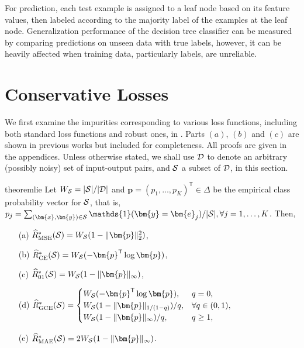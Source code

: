 \documentclass[letterpaper]{article} %
\newcommand{\bx}{{\bm{x}}}
\newcommand{\bp}{{\bm{p}}}
\newcommand{\by}{{\bm{y}}}
\newcommand{\be}{{\bm{e}}}
\newcommand{\T}{{\mathsf{T}}}
\newcommand{\I}{\mathds{1}}
\newcommand{\cS}{{\cal{S}}}
\newcommand{\cD}{{\cal{D}}}
\newcommand{\simplex}{\Delta}
\begin{document}
For prediction, each test example is assigned to a leaf node based on its
feature values, then labeled according to the majority label of the examples at
the leaf node.
Generalization performance of the decision tree classifier can be measured by
comparing predictions on unseen data with true labels, however, it can be
heavily affected when training data, particularly labels, are unreliable.

\section{Conservative Losses}
\label{sec:theory}

We first examine the impurities corresponding to various loss functions,
including both standard loss functions and robust ones, in
.
Parts $(a)$, $(b)$ and $(c)$ are shown in previous works
\cite{breiman1984classification, painsky2018universality,yang2019robust,
wilton2022positive}
but included for completeness.
All proofs are given in the appendices.
Unless otherwise stated, we shall use $\cD$ to denote an arbitrary (possibly
noisy) set of input-output pairs, and $\cS$ a subset of $\cD$, in this section.

\begin{restatable}{theorem}{lie}
\label{thm:loss_impurity_equivalence}
    Let
    $W_{\cS}=|\cS|/|\cD|$
    and
    $\bp
    =(p_1,\ldots,p_K)^\T
    \in \simplex$
    be the empirical class probability vector for $\cS$, that is,
    $p_j=\sum_{(\bx,\by)\in\cS}\I(\by=\be_j)/|\cS|,\forall j=1,\ldots,K$.
    Then,

    \begin{enumerate}
        \item[(a)] $\widehat{R}_{\mathrm{MSE}}^*(\cS)=W_{\cS}(1-\|\bp\|_2^2)$,\label{result a}
        \item[(b)] $\widehat{R}_{\mathrm{CE}}^*(\cS)=W_{\cS}(-\bp^\T\log\bp)$,
        \item[(c)] $\widehat{R}_{\mathrm{01}}^*(\cS)=W_{\cS}(1-\|\bp\|_\infty)$,
        \item[(d)] $\widehat{R}_{\mathrm{GCE}}^*(\cS)
            =
            \begin{cases}
                W_{\cS}(-\bp^\T\log\bp), & q=0, \\
                W_{\cS}(1-\|\bp\|_{1/(1-q)})/q, & \forall q\in(0,1), \\
                W_{\cS}(1-\|\bp\|_\infty)/q, & q\geq 1,
            \end{cases}$
        \item[(e)] $\widehat{R}_{\mathrm{MAE}}^*(\cS)=2W_{\cS}(1-\|\bp\|_\infty)$.
    \end{enumerate}
\end{restatable}
\end{document}
